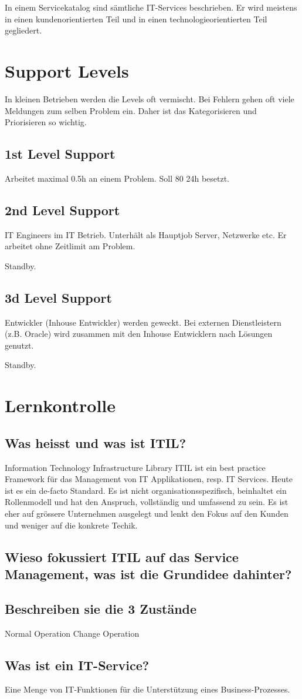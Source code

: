In einem Servicekatalog sind sämtliche IT-Services beschrieben. Er wird meistens in einen kundenorientierten Teil und in einen technologieorientierten Teil gegliedert.

\section{Support Levels}
In kleinen Betrieben werden die Levels oft vermischt.
Bei Fehlern gehen oft viele Meldungen zum selben Problem ein. Daher ist das Kategorisieren und Priorisieren so wichtig.
\subsection{1st Level Support}
Arbeitet maximal 0.5h an einem Problem. Soll 80%
24h besetzt.

\subsection{2nd Level Support}
IT Engineers im IT Betrieb. Unterhält als Hauptjob Server, Netzwerke etc.
Er arbeitet ohne Zeitlimit am Problem.

Standby.

\subsection{3d Level Support}
Entwickler (Inhouse Entwickler) werden geweckt. Bei externen Dienstleistern (z.B. Oracle) wird zusammen mit den Inhouse Entwicklern nach Lösungen genutzt.

Standby.

\section{Lernkontrolle}
\subsection{Was heisst und was ist ITIL?}

Information Technology Infrastructure Library
ITIL ist ein best practice Framework für das Management von IT Applikationen, resp. IT Services. Heute ist es ein de-facto Standard. Es ist nicht organisationsspezifisch, beinhaltet ein Rollenmodell und hat den Anspruch, vollständig und umfassend zu sein. Es ist eher auf grössere Unternehmen ausgelegt und lenkt den Fokus auf den Kunden und weniger auf die konkrete Techik.

\subsection{Wieso fokussiert ITIL auf das Service Management, was ist die Grundidee dahinter?}

\subsection{Beschreiben sie die 3 Zustände}
Normal Operation
Change Operation

\subsection{Was ist ein IT-Service?}

Eine Menge von IT-Funktionen für die Unterstützung eines Business-Prozesses. 